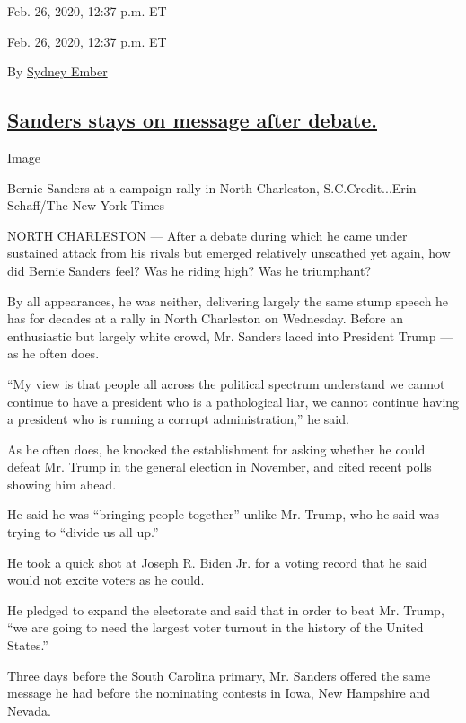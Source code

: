 Feb. 26, 2020, 12:37 p.m. ET

Feb. 26, 2020, 12:37 p.m. ET

By \href{https://www.nytimes3xbfgragh.onion/by/sydney-ember}{Sydney
Ember}

\hypertarget{sanders-stays-on-message-after-debate}{%
\subsection{\texorpdfstring{\protect\hyperlink{sanders-stays-on-message-after-debate}{Sanders
stays on message after
debate.}}{Sanders stays on message after debate.}}\label{sanders-stays-on-message-after-debate}}

Image

Bernie Sanders at a campaign rally in North Charleston,
S.C.Credit...Erin Schaff/The New York Times

NORTH CHARLESTON --- After a debate during which he came under sustained
attack from his rivals but emerged relatively unscathed yet again, how
did Bernie Sanders feel? Was he riding high? Was he triumphant?

By all appearances, he was neither, delivering largely the same stump
speech he has for decades at a rally in North Charleston on Wednesday.
Before an enthusiastic but largely white crowd, Mr. Sanders laced into
President Trump --- as he often does.

``My view is that people all across the political spectrum understand we
cannot continue to have a president who is a pathological liar, we
cannot continue having a president who is running a corrupt
administration,'' he said.

As he often does, he knocked the establishment for asking whether he
could defeat Mr. Trump in the general election in November, and cited
recent polls showing him ahead.

He said he was ``bringing people together'' unlike Mr. Trump, who he
said was trying to ``divide us all up.''

He took a quick shot at Joseph R. Biden Jr. for a voting record that he
said would not excite voters as he could.

He pledged to expand the electorate and said that in order to beat Mr.
Trump, ``we are going to need the largest voter turnout in the history
of the United States.''

Three days before the South Carolina primary, Mr. Sanders offered the
same message he had before the nominating contests in Iowa, New
Hampshire and Nevada.

